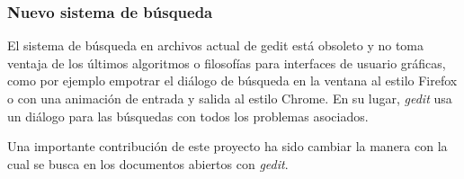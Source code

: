 \subsubsection{Nuevo sistema de búsqueda}

El sistema de búsqueda en archivos actual de gedit está obsoleto y no toma
ventaja de los últimos algoritmos o filosofías para interfaces de usuario
gráficas, como por ejemplo empotrar el diálogo de búsqueda en la ventana
al estilo Firefox o con una animación de entrada y salida al estilo Chrome.
En su lugar, \emph{gedit} usa un diálogo para las búsquedas con todos los problemas
asociados.

Una importante contribución de este proyecto ha sido cambiar la manera con la
cual se busca en los documentos abiertos con \emph{gedit}.
